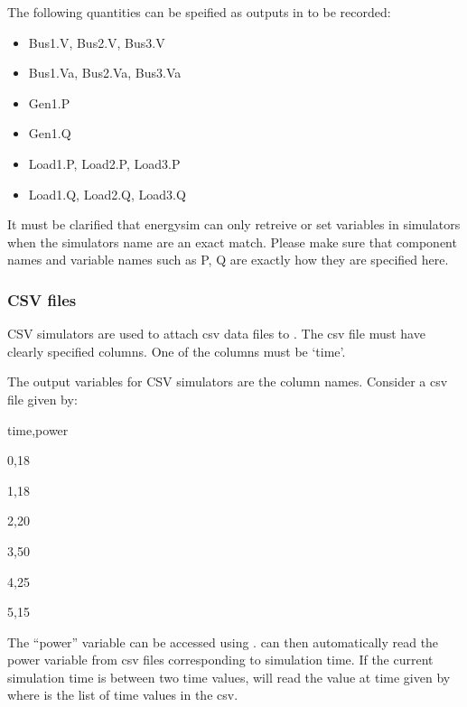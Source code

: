 \documentclass[letterpaper,10pt,english]{sphinxmanual}
\begin{document}
The following quantities can be speified as outputs in  to be recorded:
\begin{itemize}
\item {} 
Bus1.V, Bus2.V, Bus3.V

\item {} 
Bus1.Va, Bus2.Va, Bus3.Va

\item {} 
Gen1.P

\item {} 
Gen1.Q

\item {} 
Load1.P, Load2.P, Load3.P

\item {} 
Load1.Q, Load2.Q, Load3.Q

\end{itemize}

It must be clarified that energysim can only retreive or set variables in simulators when the simulators name are an exact match. Please make sure that component names and variable names such as P, Q are exactly how they are specified here.


\subsubsection{CSV files}
\label{\detokenize{add_simulator:csv-files}}
CSV simulators are used to attach csv data files to . The csv file must have clearly specified columns. One of the columns must be ‘time’.

The output variables for CSV simulators are the column names. Consider a csv file given by:

\begin{DUlineblock}{0em}
\item[] time,power
\item[] 0,18
\item[] 1,18
\item[] 2,20
\item[] 3,50
\item[] 4,25
\item[] 5,15
\end{DUlineblock}

The “power” variable can be accessed using .  can then automatically read the power variable from csv files corresponding to simulation time. If the current simulation time is between two time values,    will read the value at time given by  where  is the list of time values in the csv.
\end{document}
